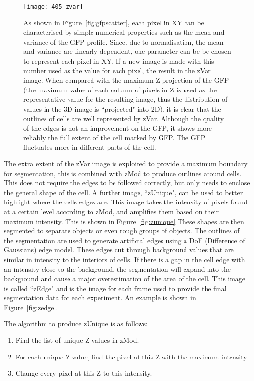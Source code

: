 \begin{figure}[h!]
 \centering
 \texttt{[image: 405\_zvar]}
 \caption[zVar example]{
 	As shown in Figure~\ref{fig:gfpscatter}, each pixel in XY can be characterised by simple numerical properties such as the mean and variance of the GFP profile. Since, due to normalisation, the mean and variance are linearly dependent, one parameter can be be chosen to represent each pixel in XY. If a new image is made with this number used as the value for each pixel, the result in the zVar image. When compared with the maximum Z-projection of the GFP (the maximum value of each column of pixels in Z is used as the representative value for the resulting image, thus the distribution of values in the 3D image is ``projected" into 2D), it is clear that the outlines of cells are well represented by zVar. Although the quality of the edges is not an improvement on the GFP, it shows more reliably the full extent of the cell marked by GFP. The GFP fluctuates more in different parts of the cell.
 }
 \label{fig:zvar}
\end{figure}

The extra extent of the zVar image is exploited to provide a maximum boundary for segmentation, this is combined with zMod to produce outlines around cells. This does not require the edges to be followed correctly, but only needs to enclose the general shape of the cell. A further image, ``zUnique", can be used to better highlight where the cells edges are. This image takes the intensity of pixels found at a certain level according to zMod, and amplifies them based on their maximum intensity. This is shown in Figure~\ref{fig:zunique} These shapes are then segmented to separate objects or even rough groups of objects. The outlines of the segmentation are used to generate artificial edges using a DoF (Difference of Gaussians) edge model. These edges cut through background values that are similar in intensity to the interiors of cells. If there is a gap in the cell edge with an intensity close to the background, the segmentation will expand into the background and cause a major overestimation of the area of the cell. This image is called ``zEdge" and is the image for each frame used to provide the final segmentation data for each experiment. An example is shown in Figure~\ref{fig:zedge}.

The algorithm to produce zUnique is as follows:
\begin{enumerate}
	\item Find the list of unique Z values in zMod.
	\item For each unique Z value, find the pixel at this Z with the maximum intensity.
	\item Change every pixel at this Z to this intensity.
\end{enumerate}

